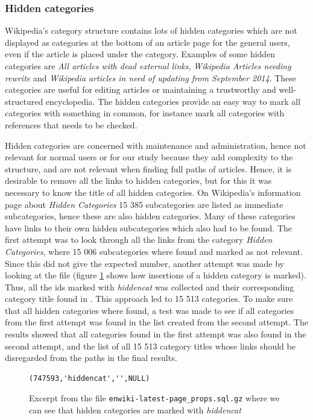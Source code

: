 \subsubsection{Hidden categories}
Wikipedia's category structure contains lots of hidden categories which are not displayed as categories at the bottom of an article page for the general users, even if the article is placed under the category. Examples of some hidden categories are \emph{All articles with dead external links}, \emph{Wikipedia Articles needing rewrite} and \emph{Wikipedia articles in need of updating from September 2014}. These categories are useful for editing articles or maintaining a trustworthy and well-structured encyclopedia. The hidden categories provide an easy way to mark all  categories with something in common, for instance mark all categories with references that needs to be checked. 

Hidden categories are concerned with maintenance and administration, hence not relevant for normal users or for our study because they add complexity to the structure, and are not relevant when finding full paths of articles. Hence, it is desirable to remove all the links to hidden categories, but for this it was necessary to know the title of all hidden categories.  On Wikipedia's information page about \emph{Hidden Categories}\cite{wiki:hiddencat} 15 385 subcategories are listed as immediate subcategories, hence these are also hidden categories. Many of these categories have links to their own hidden subcategories which also had to be found. The first attempt was to look through all the links from the category \emph{Hidden Categories}, where 15 006 subcategories where found and marked as not relevant. Since this did not give the expected number, another attempt was made by looking at the file \enwikipageprops (figure \ref{fig:pageprops} shows how insertions of a  hidden category is marked). Thus, all the ids marked with \emph{hiddencat} was collected and their corresponding category title found in \enwikipage. This approach led to 15 513 categories. To make sure that all hidden categories where found, a test was made to see if all categories from the first attempt was found in the list created from the second attempt. The results showed that all categories found in the first attempt was also found in the second attempt, and the list of all 15 513 category titles whose links should be disregarded from the paths in the final results. 

\begin{figure}[h]
\centering
\begin{lstlisting}
(747593,'hiddencat','',NULL)
\end{lstlisting}
\caption[Insert statement for hidden category]{Excerpt from the file \texttt{enwiki-latest-page\_props.sql.gz} where we can see that hidden categories are marked with \emph{hiddencat}}
\label{fig:pageprops}
\end{figure}

